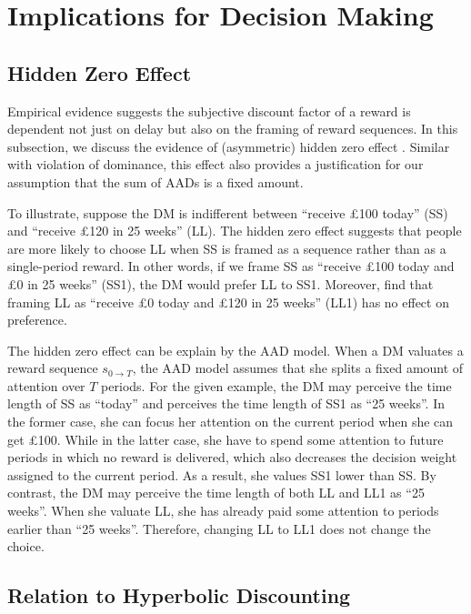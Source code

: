 \documentclass[
  12pt,
]{article}
\begin{document}
\hypertarget{implications-for-decision-making}{%
\section{Implications for Decision
Making}\label{implications-for-decision-making}}

\hypertarget{hidden-zero-effect}{%
\subsection{Hidden Zero Effect}\label{hidden-zero-effect}}

Empirical evidence suggests the subjective discount factor of a reward
is dependent not just on delay but also on the framing of reward
sequences. In this subsection, we discuss the evidence of (asymmetric)
hidden zero effect
\citep{magen2008hidden, radu2011mechanism, read2017value}. Similar with
violation of dominance, this effect also provides a justification for
our assumption that the sum of AADs is a fixed amount.

To illustrate, suppose the DM is indifferent between ``receive £100
today'' (SS) and ``receive £120 in 25 weeks'' (LL). The hidden zero
effect suggests that people are more likely to choose LL when SS is
framed as a sequence rather than as a single-period reward. In other
words, if we frame SS as ``receive £100 today and £0 in 25 weeks''
(SS1), the DM would prefer LL to SS1. Moreover, \citet{read2017value}
find that framing LL as ``receive £0 today and £120 in 25 weeks'' (LL1)
has no effect on preference.

The hidden zero effect can be explain by the AAD model. When a DM
valuates a reward sequence \(s_{0\rightarrow T}\), the AAD model assumes
that she splits a fixed amount of attention over \(T\) periods. For the
given example, the DM may perceive the time length of SS as ``today''
and perceives the time length of SS1 as ``25 weeks''. In the former
case, she can focus her attention on the current period when she can get
£100. While in the latter case, she have to spend some attention to
future periods in which no reward is delivered, which also decreases the
decision weight assigned to the current period. As a result, she values
SS1 lower than SS. By contrast, the DM may perceive the time length of
both LL and LL1 as ``25 weeks''. When she valuate LL, she has already
paid some attention to periods earlier than ``25 weeks''. Therefore,
changing LL to LL1 does not change the choice.

\hypertarget{relation-to-hyperbolic-discounting}{%
\subsection{\texorpdfstring{Relation to Hyperbolic Discounting
\label{hyperbolic}}{Relation to Hyperbolic Discounting }}\label{relation-to-hyperbolic-discounting}}
\end{document}

